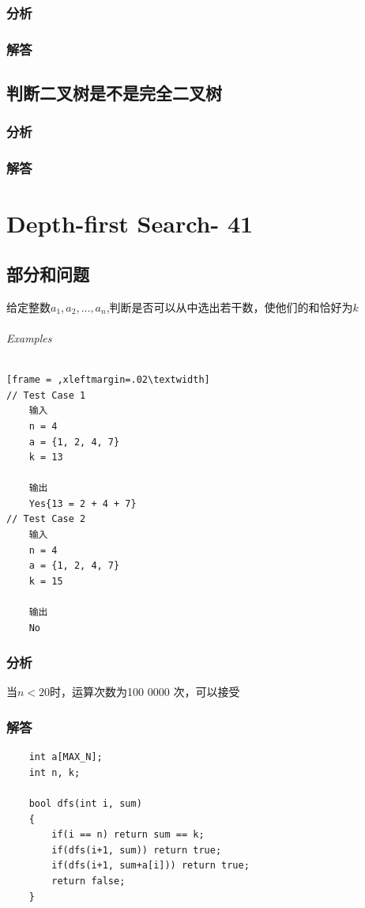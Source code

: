 \documentclass[UTF8,a4paper,12pt]{ctexbook}
\begin{document}
	\subsection{分析}
	
	\subsection{解答}
	
\section{判断二叉树是不是完全二叉树}
	\subsection{分析}
	
	\subsection{解答}
	
\chapter{Depth-first Search- 41}
\section{部分和问题}
	给定整数$a_1, a_2,...,a_n$,判断是否可以从中选出若干数，使他们的和恰好为$k$
	\subparagraph{Examples}
		\begin{lstlisting}[frame = ,xleftmargin=.02\textwidth]
// Test Case 1
	输入
	n = 4
	a = {1, 2, 4, 7}
	k = 13
	
	输出
	Yes{13 = 2 + 4 + 7}
// Test Case 2
	输入
	n = 4
	a = {1, 2, 4, 7}
	k = 15
	
	输出
	No
		\end{lstlisting}
	\subsection{分析}
	
	当$n < 20$时，运算次数为100 0000 次，可以接受
	\subsection{解答}
		\begin{lstlisting}
	int a[MAX_N];
	int n, k;
	
	bool dfs(int i, sum)
	{
		if(i == n) return sum == k;
		if(dfs(i+1, sum)) return true;
		if(dfs(i+1, sum+a[i])) return true;
		return false;
	}
		\end{lstlisting}
	
\end{document}
